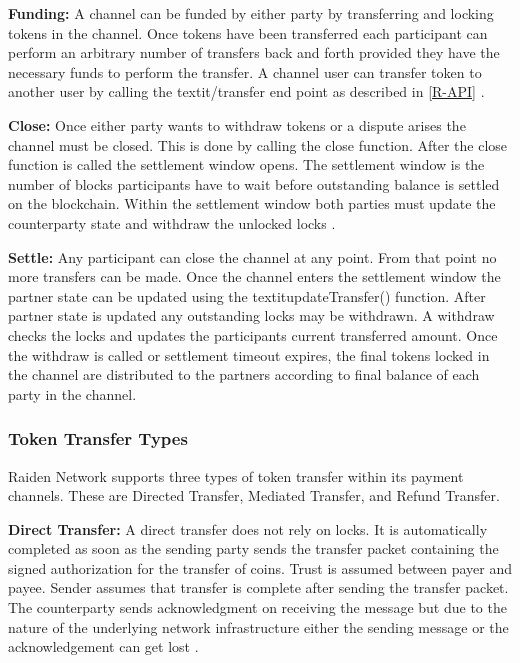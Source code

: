 \textbf{Funding:} A channel can be funded by either party by transferring and locking tokens in the channel. Once tokens have been transferred each participant can perform an arbitrary number of transfers back and forth provided they have the necessary funds to perform the transfer. A channel user can transfer token to another user by calling the textit{/transfer} end point as described in \ref{R-API} \cite{rad:001}.

\textbf{Close:} Once either party wants to withdraw tokens or a dispute arises the channel must be closed. This is done by calling the close function. After the close function is called the settlement window opens. The settlement window is the number of blocks participants have to wait before outstanding balance is settled on the blockchain. Within the settlement window both parties must update the counterparty state and withdraw the unlocked locks \cite{rad:001}.

\textbf{Settle:} Any participant can close the channel at any point. From that point no more transfers can be made. Once the channel enters the settlement window the partner state can be updated using the textit{updateTransfer()} function. After partner state is updated any outstanding locks may be withdrawn. A withdraw checks the locks and updates the participants current transferred amount. Once the withdraw is called or settlement timeout expires, the final tokens locked in the channel are distributed to the partners according to final balance of each party in the channel\cite{rad:001}. 
\clearpage
\subsubsection{Token Transfer Types} \label{RaidenTrans}
Raiden Network supports three types of token transfer within its payment channels. These are Directed Transfer, Mediated Transfer, and Refund Transfer.

\textbf{Direct Transfer:} A direct transfer does not rely on locks. It is automatically completed as soon as the sending party sends the transfer packet containing the signed authorization for the transfer of coins. Trust is assumed between payer and payee. Sender assumes that transfer is complete after sending the transfer packet. The counterparty sends acknowledgment on receiving the message but due to the nature of the underlying network infrastructure either the sending message or the acknowledgement can get lost \cite{rad:001}.

